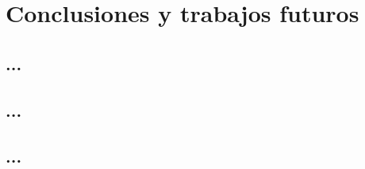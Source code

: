 \chapter{Conclusiones y trabajos futuros}
\thispagestyle{empty}

\section{...}


\section{...}


\section{...}